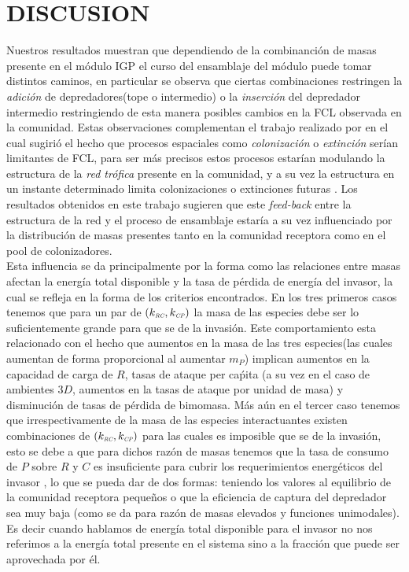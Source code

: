 \section{DISCUSION}

Nuestros resultados muestran que dependiendo de la combinanci\'on de masas presente en el m\'odulo IGP el curso del ensamblaje del m\'odulo puede tomar distintos caminos, en particular se observa que ciertas combinaciones restringen la \emph{adici\'on} de depredadores(tope o intermedio) o la \emph{inserci\'on} del depredador intermedio restringiendo de esta manera posibles cambios en la FCL observada en la comunidad. Estas observaciones complementan el trabajo realizado por \citet{holt2002food} en el cual sugiri\'o el hecho que procesos espaciales como \emph{colonizaci\'on} o \emph{extinci\'on} ser\'ian limitantes de FCL, para ser m\'as precisos estos procesos estar\'ian modulando la estructura de la \emph{red tr\'ofica} presente en la comunidad, y a su vez la estructura en un instante determinado limita colonizaciones o extinciones futuras \citep{pawar2009community,holt2002food}.  Los resultados obtenidos en este trabajo sugieren que este \emph{feed-back} entre la estructura de la red y el proceso de ensamblaje estar\'ia a su vez influenciado por la distribuci\'on de masas presentes tanto en la comunidad receptora como en el pool de colonizadores.\\

Esta influencia se da principalmente por la forma como las relaciones entre masas afectan la energ\'ia total disponible y la tasa de p\'erdida de energ\'ia del invasor, la cual se refleja en la forma de los criterios encontrados. En los tres primeros casos tenemos que para un par de $(k_{\textit{\tiny RC}},k_{\textit{\tiny CP}})$ la masa de las especies debe ser lo suficientemente grande para que se de la invasi\'on. Este comportamiento esta relacionado con el hecho que aumentos en la masa de las tres especies(las cuales aumentan de forma proporcional al aumentar $m_P$) implican aumentos en la capacidad de carga de $R$, tasas de ataque per ca\'pita (a su vez en el caso de ambientes $3D$, aumentos en la tasas de ataque por unidad de masa) y disminuci\'on de tasas de p\'erdida de bimomasa. M\'as a\'un en el tercer caso tenemos que irrespectivamente de la masa de las especies interactuantes existen combinaciones de $(k_{\textit{\tiny RC}},k_{\textit{\tiny CP}})$ para las cuales es imposible que se de la invasi\'on, esto se debe a que para dichos raz\'on de masas tenemos que la tasa de consumo de $P$ sobre $R$ y $C$ es insuficiente para cubrir los requerimientos energ\'eticos del invasor , lo que se pueda dar de dos formas: teniendo los valores al equilibrio de la comunidad receptora peque\~nos o que la eficiencia de captura del depredador sea muy baja (como se da para raz\'on de masas elevados y funciones unimodales). Es decir cuando hablamos de energ\'ia total disponible para el invasor no nos referimos a la energ\'ia total presente en el sistema sino a la fracci\'on que puede ser aprovechada por \'el.\\

